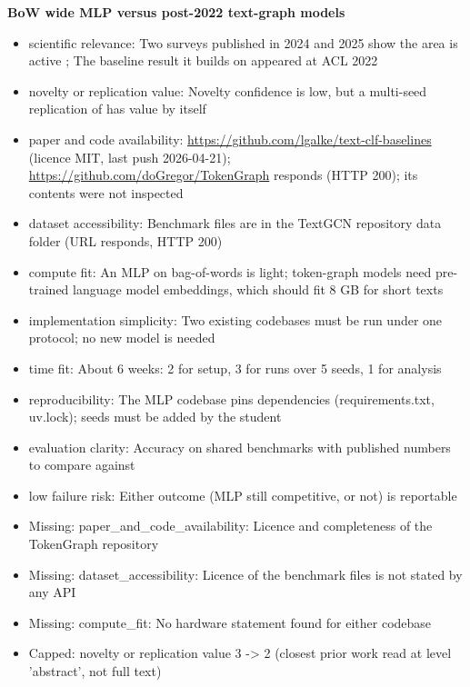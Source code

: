 \documentclass[11pt,a4paper]{article}
\begin{document}
\textbf{BoW wide MLP versus post-2022 text-graph models}
\begin{itemize}
\item scientific relevance: Two surveys published in 2024 and 2025 show the area is active \cite{wang2024,rizvi2025}; The baseline result it builds on appeared at ACL 2022 \cite{galke2022}
\item novelty or replication value: Novelty confidence is low, but a multi-seed replication of \cite{galke2022} has value by itself
\item paper and code availability: \url{https://github.com/lgalke/text-clf-baselines} (licence MIT, last push 2026-04-21); \url{https://github.com/doGregor/TokenGraph} responds (HTTP 200); its contents were not inspected
\item dataset accessibility: Benchmark files are in the TextGCN repository data folder (URL responds, HTTP 200)
\item compute fit: An MLP on bag-of-words is light; token-graph models need pre-trained language model embeddings, which should fit 8 GB for short texts
\item implementation simplicity: Two existing codebases must be run under one protocol; no new model is needed
\item time fit: About 6 weeks: 2 for setup, 3 for runs over 5 seeds, 1 for analysis
\item reproducibility: The MLP codebase pins dependencies (requirements.txt, uv.lock); seeds must be added by the student
\item evaluation clarity: Accuracy on shared benchmarks with published numbers to compare against
\item low failure risk: Either outcome (MLP still competitive, or not) is reportable
\item Missing: paper\_and\_code\_availability: Licence and completeness of the TokenGraph repository
\item Missing: dataset\_accessibility: Licence of the benchmark files is not stated by any API
\item Missing: compute\_fit: No hardware statement found for either codebase
\item Capped: novelty or replication value 3 -> 2 (closest prior work read at level 'abstract', not full text)
\end{itemize}
\end{document}
